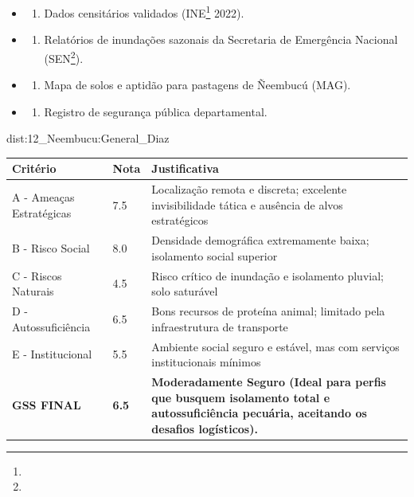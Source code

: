 {\begin{itemize}
\tightlist
\item
  \begin{enumerate}
  \def\labelenumi{\arabic{enumi})}
  \tightlist
  \item
    Dados censitários validados (INE\footnote{\fineINE} 2022).
  \end{enumerate}
\item
  \begin{enumerate}
  \def\labelenumi{\arabic{enumi})}
  \setcounter{enumi}{1}
  \tightlist
  \item
    Relatórios de inundações sazonais da Secretaria de Emergência
    Nacional (SEN\footnote{\fineSEN}).
  \end{enumerate}
\item
  \begin{enumerate}
  \def\labelenumi{\arabic{enumi})}
  \setcounter{enumi}{2}
  \tightlist
  \item
    Mapa de solos e aptidão para pastagens de Ñeembucú (MAG).
  \end{enumerate}
\item
  \begin{enumerate}
  \def\labelenumi{\arabic{enumi})}
  \setcounter{enumi}{3}
  \tightlist
  \item
    Registro de segurança pública departamental.
  \end{enumerate}
\end{itemize}}{dist:12_Neembucu:General_Diaz}
\begin{table}[ht!]
\small \begin{tabular}{p{3.0cm}p{0.8cm}p{6.0cm}} \toprule
\textbf{Critério} & \textbf{Nota} & \textbf{Justificativa} \\ \midrule
A - Ameaças Estratégicas & 7.5 & Localização remota e discreta; excelente invisibilidade tática e ausência de alvos estratégicos \\
B - Risco Social & 8.0 & Densidade demográfica extremamente baixa; isolamento social superior \\
C - Riscos Naturais & 4.5 & Risco crítico de inundação e isolamento pluvial; solo saturável \\
D - Autossuficiência & 6.5 & Bons recursos de proteína animal; limitado pela infraestrutura de transporte \\
E - Institucional & 5.5 & Ambiente social seguro e estável, mas com serviços institucionais mínimos \\
\midrule \textbf{GSS FINAL} & \textbf{6.5} & \textbf{Moderadamente Seguro (Ideal para perfis que busquem isolamento total e autossuficiência pecuária, aceitando os desafios logísticos).} \\ \bottomrule \end{tabular}
\end{table}
